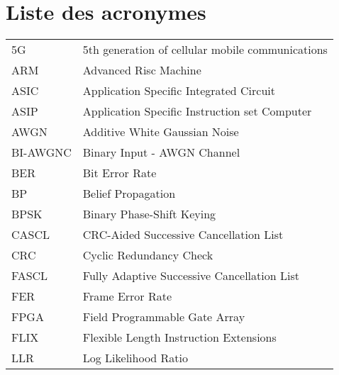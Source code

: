 \chapter*{Liste des acronymes}
\begin{center}

\begin{longtable}{ p{}  p{} } 

5G        & 5th generation of cellular mobile communications       \\
ARM       & Advanced Risc Machine                                  \\
ASIC      & Application Specific Integrated Circuit                \\
ASIP      & Application Specific Instruction set Computer          \\
AWGN      & Additive White Gaussian Noise                          \\
BI-AWGNC  & Binary Input - AWGN Channel                            \\
BER       & Bit Error Rate                                         \\
BP        & Belief Propagation                                     \\
BPSK      & Binary Phase-Shift Keying                              \\
CASCL     & CRC-Aided Successive Cancellation List                 \\
CRC       & Cyclic Redundancy Check                                \\
FASCL     & Fully Adaptive Successive Cancellation List            \\
FER       & Frame Error Rate                                       \\
FPGA      & Field Programmable Gate Array                          \\
FLIX      & Flexible Length Instruction Extensions                 \\
LLR       & Log Likelihood Ratio                                   \\

\end{longtable}
\end{center}
